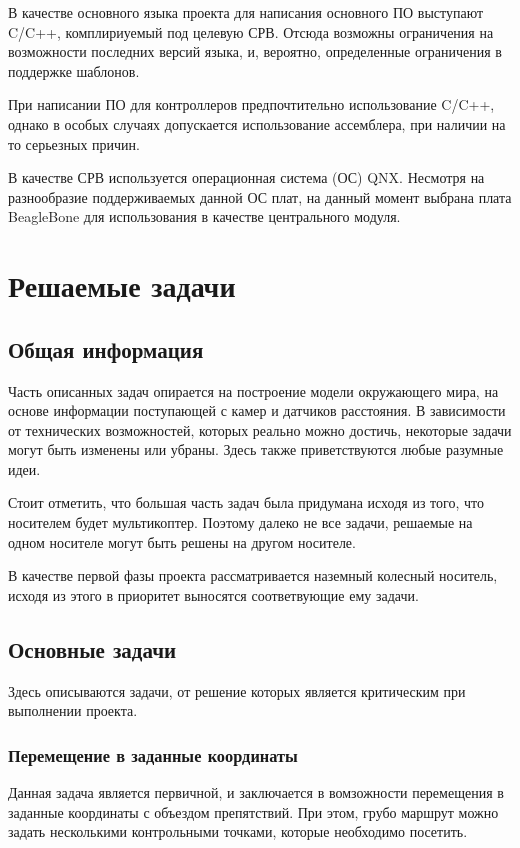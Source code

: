 \documentclass[utf8]{report}
\begin{document}
В качестве основного языка проекта для написания основного ПО выступают C/C++, комплириуемый под целевую СРВ. Отсюда возможны ограничения на возможности последних версий языка, и, вероятно, определенные ограничения в поддержке шаблонов.

При написании ПО для контроллеров предпочтительно использование C/C++, однако в особых случаях допускается использование ассемблера, при наличии на то серьезных причин.

В качестве СРВ используется операционная система (ОС) QNX. Несмотря на разнообразие поддерживаемых данной ОС плат, на данный момент выбрана плата BeagleBone для использования в качестве центрального модуля.

\chapter{Решаемые задачи}

\section{Общая информация}

Часть описанных задач опирается на построение модели окружающего мира, на основе информации поступающей с камер и датчиков расстояния. В зависимости от технических возможностей, которых реально можно достичь, некоторые задачи могут быть изменены или убраны. Здесь также приветствуются любые разумные идеи.

Стоит отметить, что большая часть задач была придумана исходя из того, что носителем будет мультикоптер. Поэтому далеко не все задачи, решаемые на одном носителе могут быть решены на другом носителе.

В качестве первой фазы проекта рассматривается наземный колесный носитель, исходя из этого в приоритет выносятся соответвующие ему задачи.

\section{Основные задачи}

Здесь описываются задачи, от решение которых является критическим при выполнении проекта.

\subsection{Перемещение в заданные координаты}

Данная задача является первичной, и заключается в вомзожности перемещения в заданные координаты с объездом препятствий. При этом, грубо маршрут можно задать несколькими контрольными точками, которые необходимо посетить.
\end{document}
